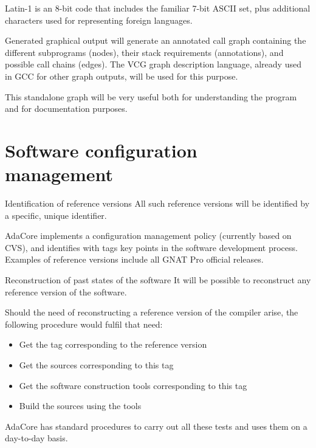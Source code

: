\begin{rationale}
  Latin-1 is an 8-bit code that includes the familiar 7-bit ASCII set,
  plus additional characters used for representing foreign languages.
\end{rationale}

\begin{requirement}{Generated graphical output}
  \ssat{} will generate an annotated call graph containing the
  different subprograms (nodes), their stack requirements
  (annotations), and possible call chains (edges).
  The VCG  graph description language, already used in
  GCC for other graph outputs, will be used for this purpose.
\end{requirement}

\begin{rationale}
  This standalone graph will be very useful both for understanding the
  program and for documentation purposes.
\end{rationale}

\section{Software configuration management}\label{sc:configuration}

\begin{requirement}{Identification of reference versions}
  All such reference versions will be identified by a specific, unique
  identifier.
\end{requirement}

\begin{rationale}
  AdaCore implements a configuration management policy (currently
  based on CVS), and identifies with tags key points in the software
  development process. Examples of reference versions include all GNAT
  Pro official releases.
\end{rationale}

\begin{requirement}{Reconstruction of past states of the software}
  It will be possible to reconstruct any reference version of the
  software.
\end{requirement}

\begin{rationale}
  Should the need of reconstructing a reference version of the
  compiler arise, the following procedure would fulfil that need:
  \begin{itemize}
    \item Get the tag corresponding to the reference version
    \item Get the sources corresponding to this tag
    \item Get the software construction tools corresponding to this
      tag
    \item Build the sources using the tools
  \end{itemize}
  AdaCore has standard procedures to carry out all these tests and uses
  them on a day-to-day basis.
\end{rationale}

